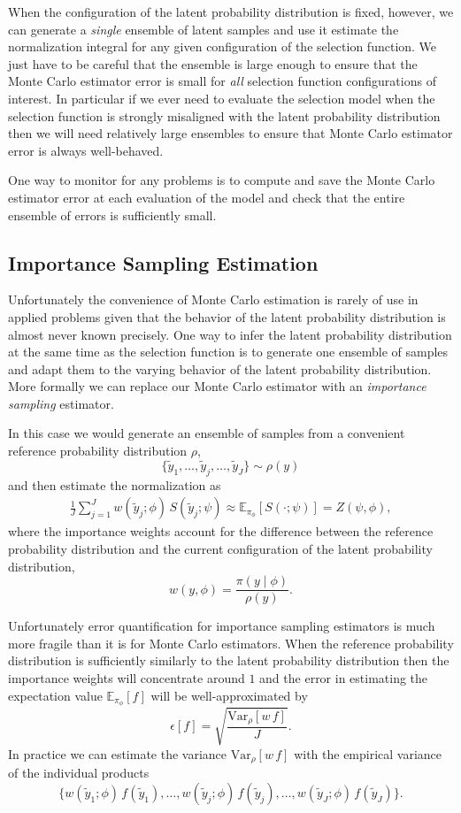 \documentclass[
  letterpaper,
  DIV=11,
  numbers=noendperiod]{scrartcl}
\begin{document}
When the configuration of the latent probability distribution is fixed,
however, we can generate a \emph{single} ensemble of latent samples and
use it estimate the normalization integral for any given configuration
of the selection function. We just have to be careful that the ensemble
is large enough to ensure that the Monte Carlo estimator error is small
for \emph{all} selection function configurations of interest. In
particular if we ever need to evaluate the selection model when the
selection function is strongly misaligned with the latent probability
distribution then we will need relatively large ensembles to ensure that
Monte Carlo estimator error is always well-behaved.

One way to monitor for any problems is to compute and save the Monte
Carlo estimator error at each evaluation of the model and check that the
entire ensemble of errors is sufficiently small.

\subsection{Importance Sampling
Estimation}\label{importance-sampling-estimation}

Unfortunately the convenience of Monte Carlo estimation is rarely of use
in applied problems given that the behavior of the latent probability
distribution is almost never known precisely. One way to infer the
latent probability distribution at the same time as the selection
function is to generate one ensemble of samples and adapt them to the
varying behavior of the latent probability distribution. More formally
we can replace our Monte Carlo estimator with an \emph{importance
sampling} estimator.

In this case we would generate an ensemble of samples from a convenient
reference probability distribution \(\rho\), \[
\{ \tilde{y}_{1}, \ldots, \tilde{y}_{j}, \ldots, \tilde{y}_{J} \}
\sim \rho(y)
\] and then estimate the normalization as \begin{align*}
\frac{1}{J} \sum_{j = 1}^{J}
w(\tilde{y}_{j}; \phi) \, S(\tilde{y}_{j}; \psi)
\approx
\mathbb{E}_{\pi_{\phi}}[ S(\cdot ; \psi) ]
=
Z(\psi, \phi),
\end{align*} where the importance weights account for the difference
between the reference probability distribution and the current
configuration of the latent probability distribution, \[
w \! \left( y, \phi \right)
=
\frac{ \pi(y \mid \phi) }{ \rho(y) }.
\]

Unfortunately error quantification for importance sampling estimators is
much more fragile than it is for Monte Carlo estimators. When the
reference probability distribution is sufficiently similarly to the
latent probability distribution then the importance weights will
concentrate around \(1\) and the error in estimating the expectation
value \(\mathbb{E}_{\pi_{\phi}}[f]\) will be well-approximated by \[
\epsilon[f] =
\sqrt{ \frac{\mathrm{Var}_{\rho}[w \, f] }{J} }.
\] In practice we can estimate the variance
\(\mathrm{Var}_{\rho}[w \, f]\) with the empirical variance of the
individual products \[
\{ w(\tilde{y}_{1}; \phi) \, f(\tilde{y}_{1}), \ldots,
   w(\tilde{y}_{j}; \phi) \, f(\tilde{y}_{j}), \ldots,
   w(\tilde{y}_{J}; \phi) \, f(\tilde{y}_{J}) \}.
\]
\end{document}
